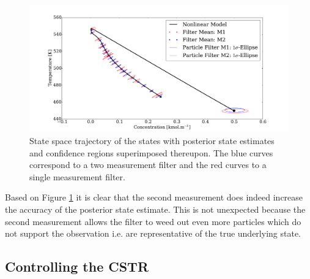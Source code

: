 \documentclass[../masters.tex]{subfiles}
\begin{document}
\begin{figure}[H] 
\centering
\includegraphics[scale=0.3]{spf_m1_m2.pdf}
\caption{State space trajectory of the states with posterior state estimates and confidence regions superimposed thereupon. The blue curves correspond to a two measurement filter and the red curves to a single measurement filter.}
\label{fig_spf_m1_m2}
\end{figure}
Based on Figure \ref{fig_spf_m1_m2} it is clear that the second measurement does indeed increase the accuracy of the posterior state estimate. This is not unexpected because the second measurement allows the filter to weed out even more particles which do not support the observation i.e. are representative of the true underlying state.





\subsection{Controlling the CSTR}

%
%
\end{document}
